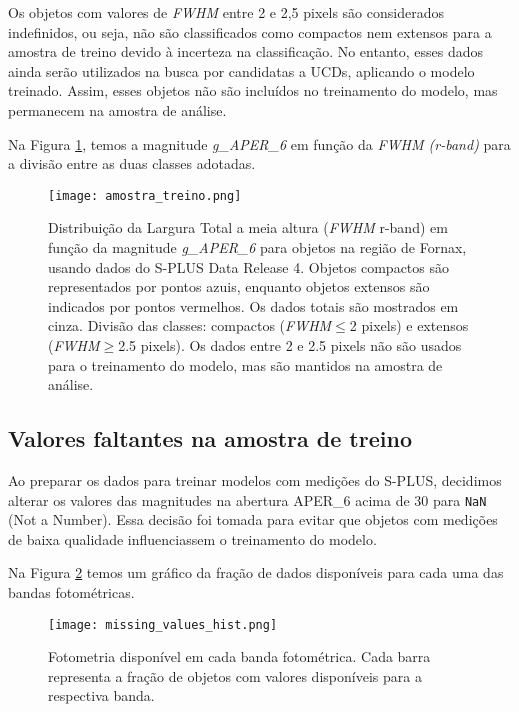 Os objetos com valores de \textit{FWHM} entre 2 e 2,5 pixels são considerados indefinidos, ou seja, não são classificados como compactos nem extensos para a amostra de treino devido à incerteza na classificação. No entanto, esses dados ainda serão utilizados na busca por candidatas a UCDs, aplicando o modelo treinado. Assim, esses objetos não são incluídos no treinamento do modelo, mas permanecem na amostra de análise.

Na Figura \ref{amostra_treino}, temos a magnitude \textit{g\_APER\_6} em função da \textit{FWHM (r-band)} para a divisão entre as duas classes adotadas.

\begin{figure}[!ht]
    \centering
    \texttt{[image: amostra\_treino.png]}
    \caption[]{Distribuição da Largura Total a meia altura (\textit{FWHM} r-band) em função da magnitude \textit{g\_APER\_6} para objetos na região de Fornax, usando dados do S-PLUS Data Release 4. Objetos compactos são representados por pontos azuis, enquanto objetos extensos são indicados por pontos vermelhos. Os dados totais são mostrados em cinza. Divisão das classes: compactos (\textit{FWHM}$\leq$2 pixels) e extensos (\textit{FWHM}$\geq$2.5 pixels). Os dados entre 2 e 2.5 pixels não são usados para o treinamento do modelo, mas são mantidos na amostra de análise.}
    \label{amostra_treino}
\end{figure}

\subsection{Valores faltantes na amostra de treino}\label{subsec:valores_faltantes}
Ao preparar os dados para treinar modelos com medições do S-PLUS, decidimos alterar os valores das magnitudes na abertura APER\_6 acima de 30 para \texttt{NaN} (Not a Number). Essa decisão foi tomada para evitar que objetos com medições de baixa qualidade influenciassem o treinamento do modelo.

Na Figura \ref{missing_values_hist} temos um gráfico da fração de dados disponíveis para cada uma das bandas fotométricas.

\begin{figure}[!ht]
    \begin{center}
    \texttt{[image: missing\_values\_hist.png]}
    \caption[]{Fotometria disponível em cada banda fotométrica. Cada barra representa a fração de objetos com valores disponíveis para a respectiva banda.}
    \label{missing_values_hist}
    \end{center}
\end{figure}

